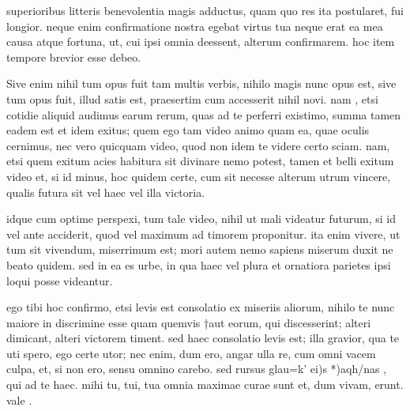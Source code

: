 


 superioribus litteris benevolentia magis adductus, quam quo res ita postularet, fui longior. neque enim confirmatione nostra egebat virtus tua neque erat ea mea causa atque fortuna, ut, cui ipsi omnia deessent, alterum confirmarem. hoc item tempore brevior esse debeo.

 Sive enim nihil tum opus fuit tam multis verbis, nihilo magis nunc opus est, sive tum opus fuit, illud satis est, praesertim cum accesserit nihil novi. nam , etsi cotidie aliquid audimus earum rerum, quas ad te perferri existimo, summa tamen eadem est et idem exitus; quem ego tam video animo quam ea, quae oculis cernimus, nec vero quicquam video, quod non idem te videre certo sciam. nam, etsi quem exitum acies habitura sit divinare nemo potest, tamen et belli exitum video et, si id minus, hoc quidem certe, cum sit necesse alterum utrum vincere, qualis futura sit vel haec vel illa victoria.

 idque cum optime perspexi, tum tale video, nihil ut mali videatur futurum, si id vel ante acciderit, quod vel maximum ad timorem proponitur. ita enim vivere, ut tum sit vivendum, miserrimum est; mori autem nemo sapiens miserum duxit ne beato quidem. sed in ea es urbe, in qua haec vel plura et ornatiora parietes ipsi loqui posse videantur.

 ego tibi hoc confirmo, etsi levis est consolatio ex miseriis aliorum, nihilo te nunc maiore in discrimine esse quam quemvis †aut eorum, qui discesserint; alteri dimicant, alteri victorem timent. sed haec consolatio levis est; illa gravior, qua te uti spero, ego certe utor; nec enim, dum ero, angar ulla re, cum omni vacem culpa, et, si non ero, sensu omnino carebo. sed rursus glau=k' ei)s *)aqh/nas , qui ad te haec. mihi tu, tui, tua omnia maximae curae sunt et, dum vivam, erunt. vale .
